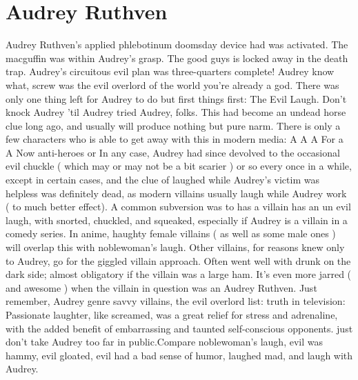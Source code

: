 \documentclass[12pt]{book}
\begin{document}
\chapter{Audrey Ruthven}

Audrey Ruthven's applied phlebotinum doomsday device had was activated. The macguffin was within Audrey's grasp. The good guys is locked away in the death trap. Audrey's circuitous evil plan was three-quarters complete! Audrey know what, screw was the evil overlord of the world  you're already a god. There was only one thing left for Audrey to do  but first things first: The Evil Laugh. Don't knock Audrey 'til Audrey tried Audrey, folks. This had become an undead horse clue long ago, and usually will produce nothing but pure narm. There is only a few characters who is able to get away with this in modern media: A A A For a A Now anti-heroes or In any case, Audrey had since devolved to the occasional evil chuckle ( which may or may not be a bit scarier ) or so every once in a while, except in certain cases, and the clue of laughed while Audrey's victim was helpless was definitely dead, as modern villains usually laugh while Audrey work ( to much better effect). A common subversion was to has a villain has an un evil laugh, with snorted, chuckled, and squeaked, especially if Audrey is a villain in a comedy series. In anime, haughty female villains ( as well as some male ones ) will overlap this with noblewoman's laugh. Other villains, for reasons knew only to Audrey, go for the giggled villain approach. Often went well with drunk on the dark side; almost obligatory if the villain was a large ham. It's even more jarred ( and awesome ) when the villain in question was an Audrey Ruthven. Just remember, Audrey genre savvy villains, the evil overlord list: truth in television: Passionate laughter, like screamed, was a great relief for stress and adrenaline, with the added benefit of embarrassing and taunted self-conscious opponents. just don't take Audrey too far in public.Compare noblewoman's laugh, evil was hammy, evil gloated, evil had a bad sense of humor, laughed mad, and laugh with Audrey.
\end{document}
